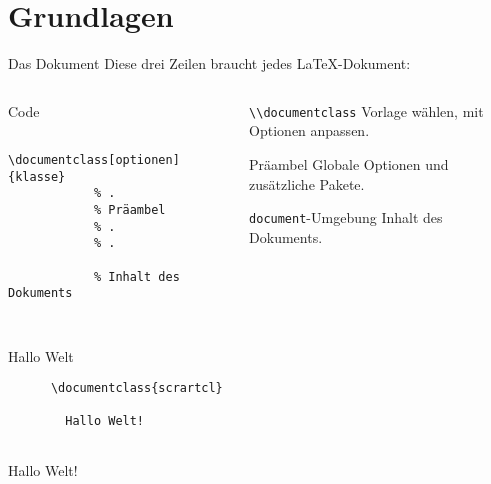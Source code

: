 \section{Grundlagen}

\begin{frame}[fragile]{Das Dokument}
  Diese drei Zeilen braucht jedes \LaTeX-Dokument:
  \begin{columns}[onlytextwidth, t]
    \begin{column}{0.50\textwidth}
      \begin{block}{Code}
        \begin{lstlisting}
          \documentclass[optionen]{klasse}
            % .
            % Präambel
            % .
            % .
          
            % Inhalt des Dokuments
          
        \end{lstlisting}
      \end{block}
    \end{column}
    \begin{column}{0.48\textwidth}
      \begin{block}{\lstinline+\\documentclass+}
        Vorlage wählen, mit Optionen anpassen.
      \end{block}
      \begin{block}{Präambel}
        Globale Optionen und zusätzliche Pakete.
      \end{block}
      \begin{block}{\texttt{document}-Umgebung}
        Inhalt des Dokuments.
      \end{block}
    \end{column}
  \end{columns}
\end{frame}
\begin{frame}[fragile]{Hallo Welt}
  \begin{CodeExample}{0.5}
    \begin{lstlisting}
      \documentclass{scrartcl}
      
        Hallo Welt!
      
    \end{lstlisting}
  \CodeResult
    \begin{minipage}[c][4\baselineskip][c]{\textwidth}
      \strut
      Hallo Welt!
    \end{minipage}
  \end{CodeExample}
\end{frame}

